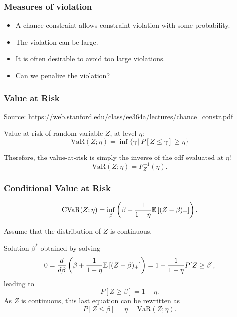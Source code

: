 \documentclass{beamer}
\begin{document}
\begin{frame}
\frametitle{Measures of violation}

\begin{itemize}
\item 
A chance constraint allows constraint violation with some probability.
\item
The violation can be large.
\item
It is often desirable to avoid too large violations.
\item
Can we penalize the violation?
\end{itemize}

\end{frame}

\begin{frame}
\frametitle{Value at Risk}

Source: \url{https://web.stanford.edu/class/ee364a/lectures/chance_constr.pdf}

\mbox{}

Value-at-risk of random variable $Z$, at level $\eta$:
$$
\text{VaR}(Z;\eta) = \inf \{ \gamma \,|\, P[Z \leq \gamma] \geq \eta \}
$$

\mbox{}

Therefore, the value-at-risk is simply the inverse of the cdf evaluated at $\eta$!
$$
\text{VaR}(Z;\eta) = F_Z^{-1}(\eta).
$$

\end{frame}

\begin{frame}
\frametitle{Conditional Value at Risk}

$$
\text{CVaR}(Z; \eta) = \inf_{\beta} \left( \beta + \frac{1}{1 - \eta} {\mathbb{E}} \left[ (Z - \beta)_+ \right] \right).
$$

\mbox{}

Assume that the distribution of $Z$ is continuous.

\mbox{}

Solution $\beta^*$ obtained by solving
$$
0 = \frac{d}{d \beta} \left( \beta + \frac{1}{1 - \eta} {\mathbb{E}} \left[ (Z - \beta)_+ \right] \right)
= 1 - \frac{1}{1 - \eta} P[ Z \geq \beta ],
$$
leading to
$$
P[ Z \geq \beta ] = 1 - \eta.
$$
As $Z$ is continuous, this last equation can be rewritten as
$$
P[ Z \leq \beta ] = \eta = \text{VaR}(Z; \eta).
$$

\end{frame}
\end{document}
